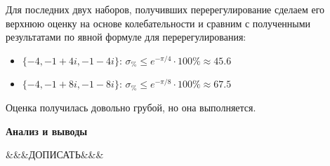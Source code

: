 \begin{par}
\begin{flushleft}
Для последних двух наборов, получивших перерегулирование сделаем его верхнюю оценку на основе колебательности и сравним с полученными результатами по явной формуле для перерегулирования:
\end{flushleft}
\end{par}

\begin{itemize}
\setlength{\itemsep}{-1ex}
   \item{\begin{flushleft} $\lbrace -4,-1+4i,-1-4i\rbrace$: $\sigma_{\%} \le e^{-\pi /4} \cdot 100\%\approx 45.6$ \end{flushleft}}
   \item{\begin{flushleft} $\lbrace -4,-1+8i,-1-8i\rbrace$: $\sigma_{\%} \le e^{-\pi /8} \cdot 100\%\approx 67.5$ \end{flushleft}}
\end{itemize}

\begin{par}
\begin{flushleft}
Оценка получилась довольно грубой, но она выполняется.
\end{flushleft}
\end{par}

\begin{par}
\begin{flushleft}
\textbf{Анализ и выводы}
\end{flushleft}
\end{par}

\begin{par}
\begin{flushleft}
\&\&\&ДОПИСАТЬ\&\&\&
\end{flushleft}
\end{par}





